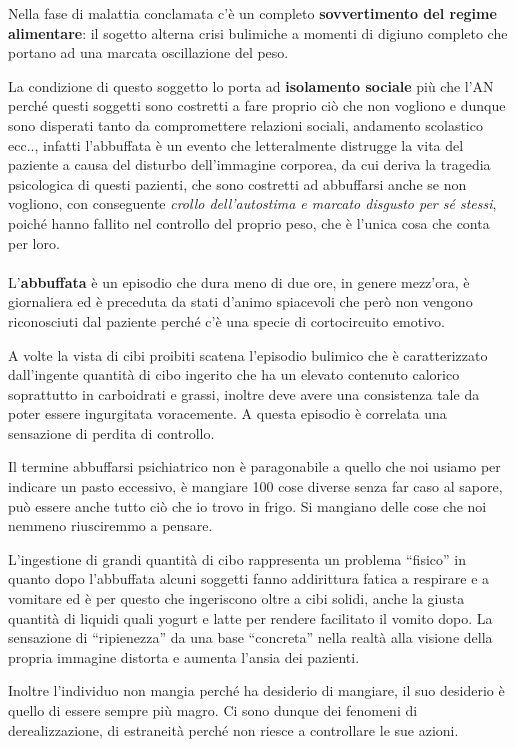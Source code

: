 Nella fase di malattia conclamata c'è un completo \textbf{sovvertimento
del regime alimentare}: il sogetto alterna crisi bulimiche a momenti di
digiuno completo che portano ad una marcata oscillazione del peso.

La condizione di questo soggetto lo porta ad \textbf{isolamento sociale}
più che l'AN perché questi soggetti sono costretti a fare proprio ciò
che non vogliono e dunque sono disperati tanto da compromettere
relazioni sociali, andamento scolastico ecc.., infatti l'abbuffata è un
evento che letteralmente distrugge la vita del paziente a causa del
disturbo dell'immagine corporea, da cui deriva la tragedia psicologica
di questi pazienti, che sono costretti ad abbuffarsi anche se non
vogliono, con conseguente \emph{crollo dell'autostima e marcato disgusto
per sé stessi}, poiché hanno fallito nel controllo del proprio peso, che
è l'unica cosa che conta per loro.
\\\\
L'\textbf{abbuffata} è un episodio che dura meno di due ore, in genere
mezz'ora, è giornaliera ed è preceduta da stati d'animo spiacevoli che
però non vengono riconosciuti dal paziente perché c'è una specie di
cortocircuito emotivo.

A volte la vista di cibi proibiti scatena l'episodio bulimico che è
caratterizzato dall'ingente quantità di cibo ingerito che ha un elevato
contenuto calorico soprattutto in carboidrati e grassi, inoltre deve
avere una consistenza tale da poter essere ingurgitata voracemente. A
questa episodio è correlata una sensazione di perdita di controllo.

Il termine abbuffarsi psichiatrico non è paragonabile a quello che noi
usiamo per indicare un pasto eccessivo, è mangiare 100 cose diverse
senza far caso al sapore, può essere anche tutto ciò che io trovo in
frigo. Si mangiano delle cose che noi nemmeno riusciremmo a pensare.

L'ingestione di grandi quantità di cibo rappresenta un problema
``fisico'' in quanto dopo l'abbuffata alcuni soggetti fanno addirittura
fatica a respirare e a vomitare ed è per questo che ingeriscono oltre a
cibi solidi, anche la giusta quantità di liquidi quali yogurt e latte
per rendere facilitato il vomito dopo. La sensazione di ``ripienezza''
da una base ``concreta'' nella realtà alla visione della propria
immagine distorta e aumenta l'ansia dei pazienti.

Inoltre l'individuo non mangia perché ha desiderio di mangiare, il suo
desiderio è quello di essere sempre più magro. Ci sono dunque dei
fenomeni di derealizzazione, di estraneità perché non riesce a
controllare le sue azioni.

